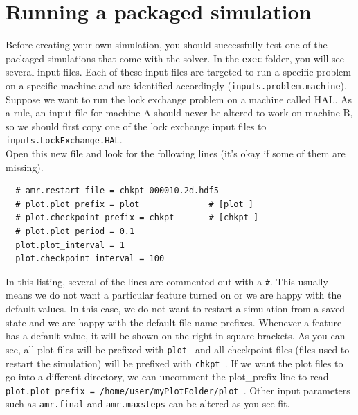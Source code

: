 \documentclass[12pt]{article}
\begin{document}
\section{Running a packaged simulation}
Before creating your own simulation, you should successfully test one of the packaged simulations that come with the solver. In the \texttt{exec} folder, you will see several input files. Each of these input files are targeted to run a specific problem on a specific machine and are identified accordingly (\texttt{inputs.problem.machine}). Suppose we want to run the lock exchange problem on a machine called HAL. As a rule, an input file for machine A should never be altered to work on machine B, so we should first copy one of the lock exchange input files to \texttt{inputs.LockExchange.HAL}.\\

Open this new file and look for the following lines (it's okay if some of them are missing).
\begin{lstlisting}
  # amr.restart_file = chkpt_000010.2d.hdf5
  # plot.plot_prefix = plot_             # [plot_]
  # plot.checkpoint_prefix = chkpt_      # [chkpt_]
  # plot.plot_period = 0.1
  plot.plot_interval = 1
  plot.checkpoint_interval = 100
\end{lstlisting}
In this listing, several of the lines are commented out with a \texttt{\#}. This usually means we do not want a particular feature turned on or we are happy with the default values. In this case, we do not want to restart a simulation from a saved state and we are happy with the default file name prefixes. Whenever a feature has a default value, it will be shown on the right in square brackets. As you can see, all plot files will be prefixed with \texttt{plot\_} and all checkpoint files (files used to restart the simulation) will be prefixed with \texttt{chkpt\_}. If we want the plot files to go into a different directory, we can uncomment the plot\_prefix line to read \texttt{plot.plot\_prefix = /home/user/myPlotFolder/plot\_}. Other input parameters such as \texttt{amr.final} and \texttt{amr.maxsteps} can be altered as you see fit.\\

\end{document}
